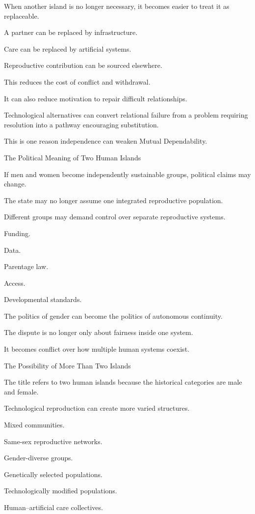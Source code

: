 When another island is no longer necessary, it becomes easier to treat it as replaceable.

A partner can be replaced by infrastructure.

Care can be replaced by artificial systems.

Reproductive contribution can be sourced elsewhere.

This reduces the cost of conflict and withdrawal.

It can also reduce motivation to repair difficult relationships.

Technological alternatives can convert relational failure from a problem requiring resolution into a pathway encouraging substitution.

This is one reason independence can weaken Mutual Dependability.

The Political Meaning of Two Human Islands

If men and women become independently sustainable groups, political claims may change.

The state may no longer assume one integrated reproductive population.

Different groups may demand control over separate reproductive systems.

Funding.

Data.

Parentage law.

Access.

Developmental standards.

The politics of gender can become the politics of autonomous continuity.

The dispute is no longer only about fairness inside one system.

It becomes conflict over how multiple human systems coexist.

The Possibility of More Than Two Islands

The title refers to two human islands because the historical categories are male and female.

Technological reproduction can create more varied structures.

Mixed communities.

Same-sex reproductive networks.

Gender-diverse groups.

Genetically selected populations.

Technologically modified populations.

Human–artificial care collectives.

